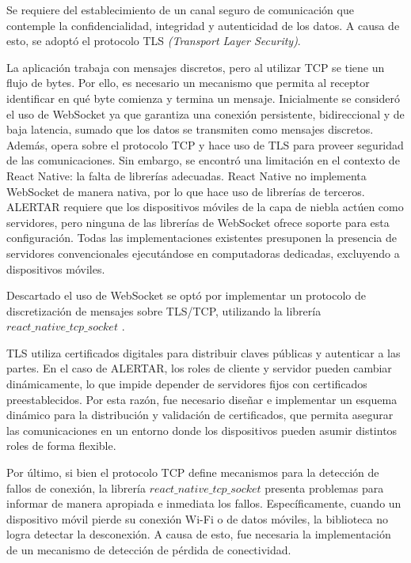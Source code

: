 Se requiere del establecimiento de un canal seguro de comunicación que contemple la confidencialidad, integridad y autenticidad de los datos. A causa de esto, se adoptó el protocolo TLS \textit{(Transport Layer Security)}.

La aplicación trabaja con mensajes discretos, pero al utilizar TCP se tiene un flujo de bytes. Por ello, es necesario un mecanismo que permita al receptor identificar en qué byte comienza y termina un mensaje. Inicialmente se consideró el uso de WebSocket \cite{fette2011websocket} ya que garantiza una conexión persistente, bidireccional y de baja latencia, sumado que los datos se transmiten como mensajes discretos. Además, opera sobre el protocolo TCP y hace uso de TLS para proveer seguridad de las comunicaciones. Sin embargo, se encontró una limitación en el contexto de React Native: la falta de librerías adecuadas. React Native no implementa WebSocket de manera nativa, por lo que hace uso de librerías de terceros. ALERTAR requiere que los dispositivos móviles de la capa de niebla actúen como servidores, pero ninguna de las librerías de WebSocket ofrece soporte para esta configuración. Todas las implementaciones existentes presuponen la presencia de servidores convencionales ejecutándose en computadoras dedicadas, excluyendo a dispositivos móviles.

Descartado el uso de WebSocket se optó por implementar un protocolo de discretización de mensajes sobre TLS/TCP, utilizando la librería $react\_native\_tcp\_socket$ \cite{react-native-tcp-socket}.

TLS utiliza certificados digitales para distribuir claves públicas y autenticar a las partes. En el caso de ALERTAR, los roles de cliente y servidor pueden cambiar dinámicamente, lo que impide depender de servidores fijos con certificados preestablecidos. Por esta razón, fue necesario diseñar e implementar un esquema dinámico para la distribución y validación de certificados, que permita asegurar las comunicaciones en un entorno donde los dispositivos pueden asumir distintos roles de forma flexible.

Por último, si bien el protocolo TCP define mecanismos para la detección de fallos de conexión, la librería $react\_native\_tcp\_socket$ presenta problemas para informar de manera apropiada e inmediata los fallos. Específicamente, cuando un dispositivo móvil pierde su conexión Wi-Fi o de datos móviles, la biblioteca no logra detectar la desconexión. A causa de esto, fue necesaria la implementación de un mecanismo de detección de pérdida de conectividad.

